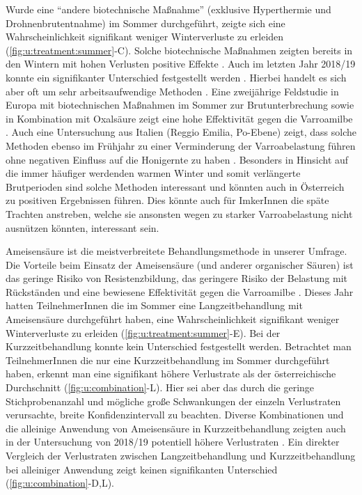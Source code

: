 Wurde eine \enquote{andere biotechnische Maßnahme} (exklusive Hyperthermie und Drohnenbrutentnahme) im Sommer durchgeführt, zeigte sich eine Wahrscheinlichkeit signifikant weniger Winterverluste zu erleiden (\cref{fig:u:treatment:summer}-C). Solche biotechnische Maßnahmen zeigten bereits in den Wintern mit hohen Verlusten positive Effekte \citep{crailsheim2018}. Auch im letzten Jahr 2018/19 konnte ein signifikanter Unterschied festgestellt werden \citep{oberreiter2020}. Hierbei handelt es sich aber oft um sehr arbeitsaufwendige Methoden \citep{rosenkranz2010, buchler2020}. Eine zweijährige Feldstudie in Europa mit biotechnischen Maßnahmen im Sommer zur Brutunterbrechung sowie in Kombination mit Oxalsäure zeigt eine hohe Effektivität gegen die Varroamilbe \citep{buchler2020}. Auch eine Untersuchung aus Italien (Reggio Emilia, Po-Ebene) zeigt, dass solche Methoden ebenso im Frühjahr zu einer Verminderung der Varroabelastung führen ohne negativen Einfluss auf die Honigernte zu haben \citep{lodesani2019}. Besonders in Hinsicht auf die immer häufiger werdenden warmen Winter und somit verlängerte Brutperioden sind solche Methoden interessant und könnten auch in Österreich zu positiven Ergebnissen führen. Dies könnte auch für ImkerInnen die späte Trachten anstreben, welche sie ansonsten wegen zu starker Varroabelastung nicht ausnützen könnten, interessant sein.

\label{sss:AS:U}

Ameisensäure ist die meistverbreitete Behandlungsmethode in unserer Umfrage. Die Vorteile beim Einsatz der Ameisensäure (und anderer organischer Säuren) ist das geringe Risiko von Resistenzbildung, das geringere Risiko der Belastung mit Rückständen und eine bewiesene Effektivität gegen die Varroamilbe \citep{rosenkranz2010, noel2020}.
\newline
Dieses Jahr hatten TeilnehmerInnen die im Sommer eine Langzeitbehandlung mit Ameisensäure durchgeführt haben, eine Wahrscheinlichkeit signifikant weniger Winterverluste zu erleiden (\cref{fig:u:treatment:summer}-E). Bei der Kurzzeitbehandlung konnte kein Unterschied festgestellt werden. Betrachtet man TeilnehmerInnen die nur eine Kurzzeitbehandlung im Sommer durchgeführt haben, erkennt man eine signifikant höhere Verlustrate als der österreichische Durchschnitt (\cref{fig:u:combination}-L). Hier sei aber das durch die geringe Stichprobenanzahl und mögliche große Schwankungen der einzeln Verlustraten verursachte, breite Konfidenzintervall zu beachten. Diverse Kombinationen und die alleinige Anwendung von Ameisensäure in Kurzzeitbehandlung zeigten auch in der Untersuchung von 2018/19 potentiell höhere Verlustraten \citep{oberreiter2020}. Ein direkter Vergleich der Verlustraten zwischen Langzeitbehandlung und Kurzzeitbehandlung bei alleiniger Anwendung zeigt keinen signifikanten Unterschied (\cref{fig:u:combination}-D,L).

